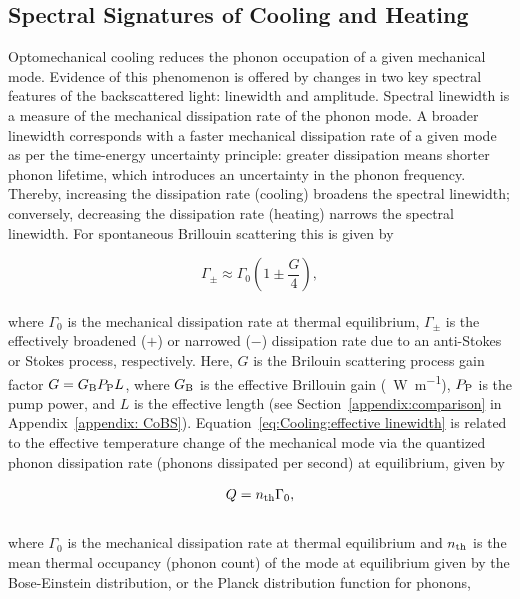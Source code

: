 \subsection{Spectral Signatures of Cooling and Heating}
\label{Cooling:subsec:SpectralSignaturesofCoolingandHeating}

Optomechanical cooling reduces the phonon occupation of a given mechanical mode. Evidence of this phenomenon is offered by changes in two key spectral features of the backscattered light: linewidth and amplitude. Spectral linewidth is a measure of the mechanical dissipation rate of the phonon mode. A broader linewidth corresponds with a faster mechanical dissipation rate of a given mode as per the time-energy uncertainty principle: greater dissipation means shorter phonon lifetime, which introduces an uncertainty in the phonon frequency. Thereby, increasing the dissipation rate (cooling) broadens the spectral linewidth; conversely, decreasing the dissipation rate (heating) narrows the spectral linewidth. For spontaneous Brillouin scattering this is given by \cite{otterstrom2018optomechanical}

\begin{equation}
  \Gamma_{\pm} \approx \Gamma_{0}\left(1 \pm \frac{G}{4}\right),
  \label{eq:Cooling:effective linewidth}
\end{equation}
\\
where \(\Gamma_{0}\) is the mechanical dissipation rate at thermal equilibrium, \(\Gamma_{\pm}\) is the effectively broadened (\(+\)) or narrowed (\(-\)) dissipation rate due to an anti-Stokes or Stokes process, respectively. Here, \(G\) is the Brilouin scattering process gain factor \(G = G_{\mathrm{B}}P_{\rm P}L\), where \(G_{\rm B}\) is the effective Brillouin gain (\si{\per\watt\per\meter}), \(P_{\rm P}\) is the pump power, and \(L\) is the effective length (see Section~\ref{appendix:comparison} in Appendix~\ref{appendix: CoBS}). Equation~\ref{eq:Cooling:effective linewidth} is related to the effective temperature change of the mechanical mode via the quantized phonon dissipation rate (phonons dissipated per second) at equilibrium, given by

\begin{equation}
  Q = n_{\rm th}\Gamma_{0},
  \label{eq:Cooling:Q}
\end{equation}
\\
where \(\Gamma_{0}\) is the mechanical dissipation rate at thermal equilibrium and \(n_{\rm th}\) is the mean thermal occupancy (phonon count) of the mode at equilibrium given by the Bose-Einstein distribution, or the Planck distribution function for phonons, \cite{kittel1980thermal}

